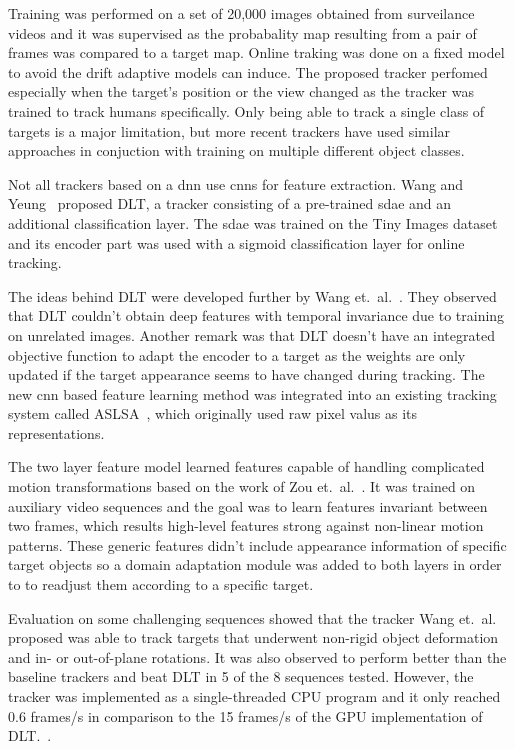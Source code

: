 Training was performed on a set of 20,000 images obtained from surveilance videos and it
was supervised as the probabality map resulting from a pair of frames was compared to a
target map. Online traking was done on a fixed model to avoid the drift adaptive models
can induce. The proposed tracker perfomed especially when the target's position or the
view changed as the tracker was trained to track humans specifically. Only being able
to track a single class of targets is a major limitation, but more recent trackers have
used similar approaches in conjuction with training on multiple different object classes.~\cite{HUMAN_CNN}

Not all trackers based on a \ac{dnn} use \ac{cnn}s for feature extraction. Wang and
Yeung~\cite{DLT} proposed DLT, a tracker consisting of a pre-trained \ac{sdae}
and an additional classification layer. The \ac{sdae} was trained on the Tiny Images
dataset and its encoder part was used with a sigmoid classification layer for online
tracking.

The ideas behind DLT were developed further by Wang et.~al.~\cite{LEARNED_HIERARCH}.
They observed that DLT couldn't obtain deep features with temporal invariance due to
training on unrelated images. Another remark was that DLT doesn't have an
integrated objective function to adapt the encoder to a target as the weights
are only updated if the target appearance seems to have changed during tracking.
The new \ac{cnn} based feature learning method was integrated into an existing tracking
system called ASLSA~\cite{ASLSA}, which originally used raw pixel valus as its representations.

The two layer feature model learned features capable of handling complicated motion
transformations based on the work of Zou et.~al.~\cite{INVARIANT_FEATS}. It was trained
on auxiliary video sequences and the goal was to learn features invariant between two
frames, which results high-level features strong against non-linear motion patterns. These
generic features didn't include appearance information of specific target objects so a
domain adaptation module was added to both layers in order to to readjust them according
to a specific target.~\cite{LEARNED_HIERARCH}

Evaluation on some challenging sequences showed that the tracker Wang et.~al.~\cite{LEARNED_HIERARCH}
proposed was able to track targets that underwent non-rigid object deformation and in- or
out-of-plane rotations. It was also observed to perform better than the baseline
trackers and beat DLT in 5 of the 8 sequences tested. However, the tracker was implemented
as a single-threaded CPU program and it only reached 0.6 frames/s in comparison to the 15
frames/s of the GPU implementation of DLT.~\cite{DLT}.

